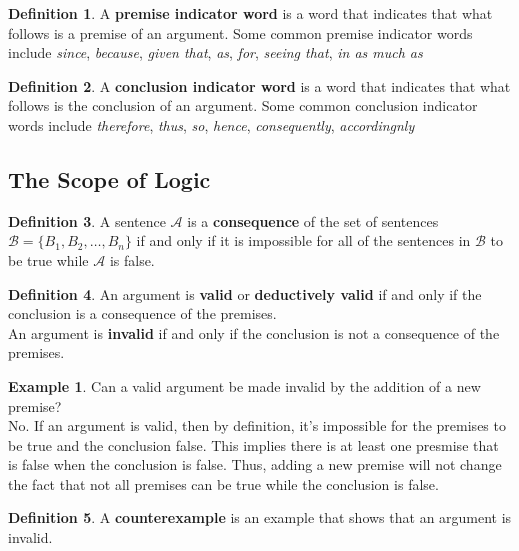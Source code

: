 \documentclass{tufte-handout}
\theoremstyle{definition}
\newtheorem{defn}{Definition}
\theoremstyle{example}
\newtheorem{exmp}{Example}
\theoremstyle{remark}
\begin{document}
\begin{defn}
  A \textbf{premise indicator word} is a word that indicates that what follows is a premise of an argument. Some common premise indicator words include \textit{since}, \textit{because}, \textit{given that}, \textit{as}, \textit{for}, \textit{seeing that}, \textit{in as much as}
\end{defn}
\begin{defn}
  A \textbf{conclusion indicator word} is a word that indicates that what follows is the conclusion of an argument. Some common conclusion indicator words include \textit{therefore}, \textit{thus}, \textit{so}, \textit{hence}, \textit{consequently}, \textit{accordingnly}
\end{defn}

\subsection{The Scope of Logic}
\begin{framed}
  \begin{defn}
    A sentence $\mathcal{A}$ is a \textbf{consequence} of the set of sentences $\mathcal{B} = \{B_1, B_2, \ldots, B_n\}$ if and only if it is impossible for all of the sentences in $\mathcal{B}$ to be true while $\mathcal{A}$ is false.
  \end{defn}
\end{framed}
\begin{framed}
  \begin{defn}
    An argument is \textbf{valid} or \textbf{deductively valid} if and only if the conclusion is a consequence of the premises. \\ An argument is \textbf{invalid} if and only if the conclusion is not a consequence of the premises.
  \end{defn}
\end{framed}
\begin{exmp}
  Can a valid argument be made invalid by the addition of a new premise? \\[1em]
  No. If an argument is valid, then by definition, it's impossible for the premises to be true and the conclusion false. This implies there is at least one presmise that is false when the conclusion is false. Thus, adding a new premise will not change the fact that not all premises can be true while the conclusion is false.
\end{exmp}
\begin{defn}
  A \textbf{counterexample} is an example that shows that an argument is invalid.
\end{defn}
\end{document}
